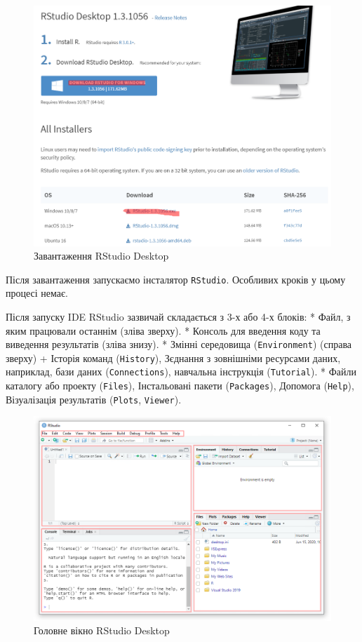 \documentclass[
]{book}
\begin{document}
\begin{figure}
\centering
\includegraphics{images/chapter1/rstudio_2.png}
\caption{\label{fig:unnamed-chunk-14}Завантаження RStudio Desktop}
\end{figure}

Після завантаження запускаємо інсталятор \texttt{RStudio}. Особливих кроків у цьому процесі немає.

Після запуску IDE RStudio зазвичай складається з 3-х або 4-х блоків:
* Файл, з яким працювали останнім (зліва зверху).
* Консоль для введення коду та виведення результатів (зліва знизу).
* Змінні середовища (\texttt{Environment}) (справа зверху) + Історія команд (\texttt{History}), Зєднання з зовнішніми ресурсами даних, наприклад, бази даних (\texttt{Connections}), навчальна інструкція (\texttt{Tutorial}).
* Файли каталогу або проекту (\texttt{Files}), Інстальовані пакети (\texttt{Packages}), Допомога (\texttt{Help}), Візуалізація результатів (\texttt{Plots}, \texttt{Viewer}).

\begin{figure}
\centering
\includegraphics{images/chapter1/rstudio_3.png}
\caption{\label{fig:unnamed-chunk-15}Головне вікно RStudio Desktop}
\end{figure}
\end{document}
